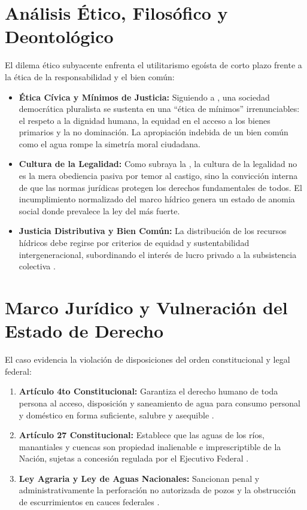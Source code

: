 \documentclass[spanish,letterpaper,oneside]{article}
\begin{document}
\section{Análisis Ético, Filosófico y Deontológico}
El dilema ético subyacente enfrenta el utilitarismo egoísta de corto plazo frente a la ética de la responsabilidad y el bien común:
\begin{itemize}
    \item \textbf{Ética Cívica y Mínimos de Justicia:} Siguiendo a \textcite{cortina2013}, una sociedad democrática pluralista se sustenta en una ``ética de mínimos'' irrenunciables: el respeto a la dignidad humana, la equidad en el acceso a los bienes primarios y la no dominación. La apropiación indebida de un bien común como el agua rompe la simetría moral ciudadana.
    \item \textbf{Cultura de la Legalidad:} Como subraya la \textcite{cndh2020}, la cultura de la legalidad no es la mera obediencia pasiva por temor al castigo, sino la convicción interna de que las normas jurídicas protegen los derechos fundamentales de todos. El incumplimiento normalizado del marco hídrico genera un estado de anomia social donde prevalece la ley del más fuerte.
    \item \textbf{Justicia Distributiva y Bien Común:} La distribución de los recursos hídricos debe regirse por criterios de equidad y sustentabilidad intergeneracional, subordinando el interés de lucro privado a la subsistencia colectiva \parencite{giusti2018}.
\end{itemize}

\section{Marco Jurídico y Vulneración del Estado de Derecho}
El caso evidencia la violación de disposiciones del orden constitucional y legal federal:
\begin{enumerate}
    \item \textbf{Artículo 4to Constitucional:} Garantiza el derecho humano de toda persona al acceso, disposición y saneamiento de agua para consumo personal y doméstico en forma suficiente, salubre y asequible \parencite{cpeum2024}.
    \item \textbf{Artículo 27 Constitucional:} Establece que las aguas de los ríos, manantiales y cuencas son propiedad inalienable e imprescriptible de la Nación, sujetas a concesión regulada por el Ejecutivo Federal \parencite{cpeum2024}.
    \item \textbf{Ley Agraria y Ley de Aguas Nacionales:} Sancionan penal y administrativamente la perforación no autorizada de pozos y la obstrucción de escurrimientos en cauces federales \parencite{ley_agraria2022}.
\end{enumerate}
\end{document}
